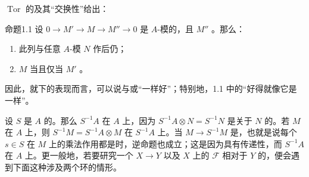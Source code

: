 $\operatorname{Tor}$ 的及其“交换性”给出：
\begin{SGAresult}{命题}{1.1}
设 $0\to M'\to M\to M''\to0$ 是 $A$-模的，且 $M''$ 。那么：
\begin{enumerate}
\item[(i)] 此列与任意 $A$-模 $N$ 作后仍；
\item[(ii)] $M$ 当且仅当 $M'$ 。
\end{enumerate}
\end{SGAresult}

因此，就下的表现而言，可以说与或“一样好”；特别地，1.1 中的“好得就像它是一样”。

设 $S$ 是 $A$ 的。那么 $S^{-1}A$ 在 $A$ 上，因为 $S^{-1}A\otimes N=S^{-1}N$ 是关于 $N$ 的。若 $M$ 在 $A$ 上，则 $S^{-1}M=S^{-1}A\otimes M$ 在 $S^{-1}A$ 上。当 $M\to S^{-1}M$ 是，也就是说每个 $s\in S$ 在 $M$ 上的乘法作用都是时，逆命题也成立；这是因为具有传递性，而 $S^{-1}A$ 在 $A$ 上。更一般地，若要研究一个 $X\to Y$ 以及 $X$ 上的 $\mathcal F$ 相对于 $Y$ 的，便会遇到下面这种涉及两个环的情形。

